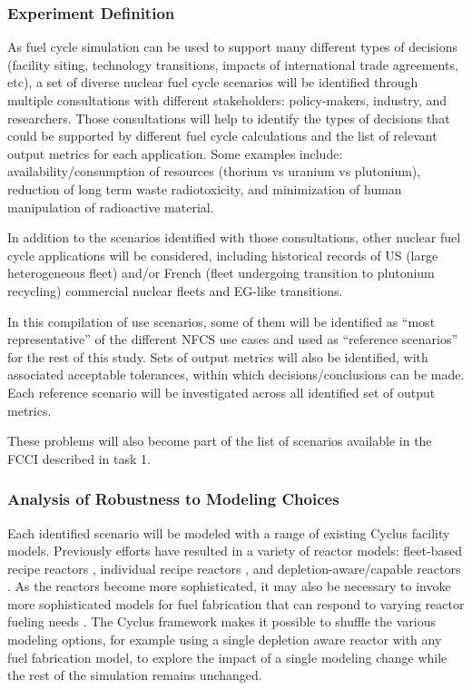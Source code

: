 \subsubsection{Experiment Definition}

As fuel cycle simulation can be used to support many different types of
decisions (facility siting, technology transitions, impacts of international
trade agreements, etc), a set of diverse nuclear fuel cycle scenarios will be
identified through multiple consultations with different stakeholders:
policy-makers, industry, and researchers.  Those consultations will help to
identify the types of decisions that could be supported by different fuel
cycle calculations and the list of relevant output metrics for each
application.  Some examples include: availability/consumption of resources
(thorium vs uranium vs plutonium), reduction of long term waste
radiotoxicity, and minimization of human manipulation of radioactive material.

In addition to the scenarios identified with those consultations, other
nuclear fuel cycle applications will be considered, including historical
records of US (large heterogeneous fleet) and/or French (fleet undergoing
transition to plutonium recycling)\cite{courtin.phd} commercial
nuclear fleets and EG-like transitions\cite{Bo.ANSW.2016}.

In this compilation of use scenarios, some of them will be identified as
``most representative'' of the different \gls{NFCS} use cases and used as
``reference scenarios'' for the rest of this study. Sets of output metrics
will also be identified, with associated acceptable tolerances, within which
decisions/conclusions can be made. Each reference scenario will be
investigated across all identified set of output metrics.

These problems will also become part of the list of scenarios available in the
\gls{FCCI} described in task 1.

\subsubsection{Analysis of Robustness to Modeling Choices}

Each identified scenario will be modeled with a range of existing Cyclus
facility models.  Previously efforts have resulted in a variety of reactor
models: fleet-based recipe reactors \cite{carlsen.NT.2016}, individual recipe
reactors \cite{cycamore.1.5.0}, and depletion-aware/capable reactors
\cite{cyborg, brightlite.2015, cyclass.2016}.  As the reactors become more
sophisticated, it may also be necessary to invoke more sophisticated models for
fuel fabrication that can respond to varying reactor fueling needs
\cite{brightlite.2015, cyclass.2016}. The Cyclus framework makes it possible to
shuffle the various modeling options, for example using a single depletion aware
reactor with any fuel fabrication model, to explore the impact of a single
modeling change while the rest of the simulation remains unchanged.

